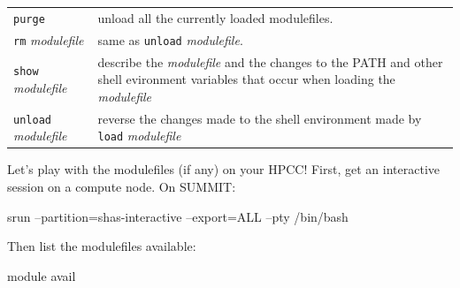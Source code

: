 \documentclass[]{krantz}
\makeatletter
\newenvironment{Shaded}{\begin{snugshade}}{\end{snugshade}}
\newcommand{\ExtensionTok}[1]{#1}
\newcommand{\NormalTok}[1]{#1}
\newenvironment{kframe}{%
\medskip{}
\setlength{\fboxsep}{.8em}
 \def\at@end@of@kframe{}%
 \ifinner\ifhmode%
  \def\at@end@of@kframe{\end{minipage}}%
  \begin{minipage}{\columnwidth}%
 \fi\fi%
 \def\FrameCommand##1{\hskip\@totalleftmargin \hskip-\fboxsep
 \colorbox{shadecolor}{##1}\hskip-\fboxsep
     \hskip-\linewidth \hskip-\@totalleftmargin \hskip\columnwidth}%
 \MakeFramed {\advance\hsize-\width
   \@totalleftmargin\z@ \linewidth\hsize
   \@setminipage}}%
 {\par\unskip\endMakeFramed%
 \at@end@of@kframe}
\renewenvironment{Shaded}{\begin{kframe}}{\end{kframe}}
\makeatother
\begin{document}
\begin{longtable}[]{@{}ll@{}}
\begin{minipage}[t]{0.31\columnwidth}\raggedright
\texttt{purge}\strut
\end{minipage} & \begin{minipage}[t]{0.43\columnwidth}\raggedright
unload all the currently
loaded modulefiles.\strut
\end{minipage}\tabularnewline
\begin{minipage}[t]{0.31\columnwidth}\raggedright
\texttt{rm} \emph{modulefile}\strut
\end{minipage} & \begin{minipage}[t]{0.43\columnwidth}\raggedright
same as \texttt{unload} \emph{modulefile}.\strut
\end{minipage}\tabularnewline
\begin{minipage}[t]{0.31\columnwidth}\raggedright
\texttt{show} \emph{modulefile}\strut
\end{minipage} & \begin{minipage}[t]{0.43\columnwidth}\raggedright
describe the \emph{modulefile} and
the changes to the PATH and
other shell evironment
variables that occur when
loading the \emph{modulefile}\strut
\end{minipage}\tabularnewline
\begin{minipage}[t]{0.31\columnwidth}\raggedright
\texttt{unload} \emph{modulefile}\strut
\end{minipage} & \begin{minipage}[t]{0.43\columnwidth}\raggedright
reverse the changes made to
the shell environment made by
\texttt{load} \emph{modulefile}\strut
\end{minipage}\tabularnewline
\bottomrule
\end{longtable}

Let's play with the modulefiles (if any) on your HPCC! First, get an interactive session
on a compute node. On SUMMIT:

\begin{Shaded}
\begin{Highlighting}[]
 \ExtensionTok{srun}\NormalTok{ --partition=shas-interactive --export=ALL --pty /bin/bash}
\end{Highlighting}
\end{Shaded}

Then list the modulefiles available:

\begin{Shaded}
\begin{Highlighting}[]
\ExtensionTok{module}\NormalTok{ avail}
\end{Highlighting}
\end{Shaded}
\end{document}
